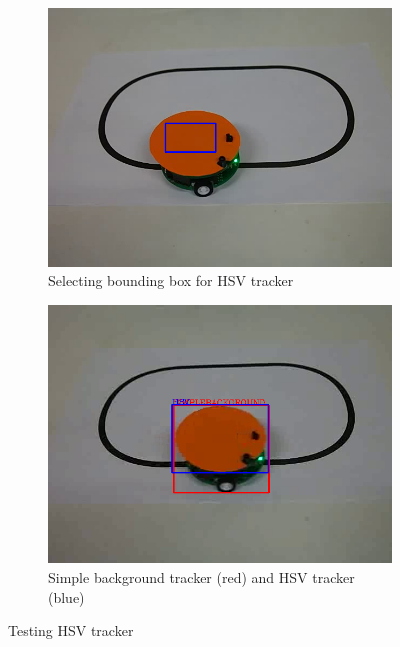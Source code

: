 \begin{figure}
\centering
\begin{subfigure}{0.48\linewidth}
\includegraphics[width=\linewidth]{img/experiments/hsv-select.png}
\caption{Selecting bounding box for HSV tracker}
\label{fig:hsv-bbox}
\end{subfigure}
\begin{subfigure}{0.48\linewidth}
\includegraphics[width=\linewidth]{img/experiments/hsv-tracking.png}
\caption{Simple background tracker (red) and HSV tracker (blue)}
\label{fig:hsv-diff}
\end{subfigure}
\caption{Testing HSV tracker}
\end{figure}

